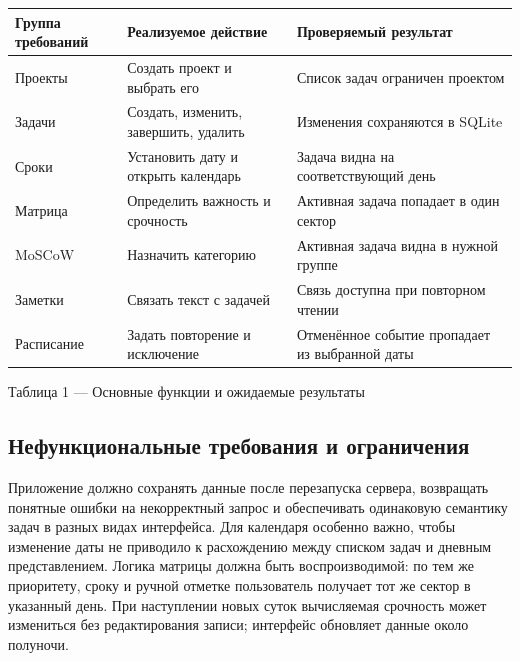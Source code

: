 \documentclass[14pt,a4paper]{extarticle}
\begin{document}
\begingroup\small
\begin{longtable}[]{@{}
  >{\raggedright\arraybackslash}p{}
  >{\raggedright\arraybackslash}p{}
  >{\raggedright\arraybackslash}p{}@{}}
\toprule\noalign{}
\begin{minipage}[b]{\linewidth}\raggedright
\textbf{Группа требований}
\end{minipage} & \begin{minipage}[b]{\linewidth}\raggedright
\textbf{Реализуемое действие}
\end{minipage} & \begin{minipage}[b]{\linewidth}\raggedright
\textbf{Проверяемый результат}
\end{minipage} \\
\midrule\noalign{}
\endhead
\bottomrule\noalign{}
\endlastfoot
Проекты & Создать проект и выбрать его & Список задач ограничен проектом \\
Задачи & Создать, изменить, завершить, удалить & Изменения сохраняются в SQLite \\
Сроки & Установить дату и открыть календарь & Задача видна на соответствующий день \\
Матрица & Определить важность и срочность & Активная задача попадает в один сектор \\
MoSCoW & Назначить категорию & Активная задача видна в нужной группе \\
Заметки & Связать текст с задачей & Связь доступна при повторном чтении \\
Расписание & Задать повторение и исключение & Отменённое событие пропадает из выбранной даты \\
\end{longtable}
\endgroup

Таблица 1 --- Основные функции и ожидаемые результаты

\subsection{Нефункциональные требования и ограничения}

Приложение должно сохранять данные после перезапуска сервера, возвращать понятные ошибки на некорректный запрос и обеспечивать одинаковую семантику задач в разных видах интерфейса. Для календаря особенно важно, чтобы изменение даты не приводило к расхождению между списком задач и дневным представлением. Логика матрицы должна быть воспроизводимой: по тем же приоритету, сроку и ручной отметке пользователь получает тот же сектор в указанный день. При наступлении новых суток вычисляемая срочность может измениться без редактирования записи; интерфейс обновляет данные около полуночи.
\end{document}
